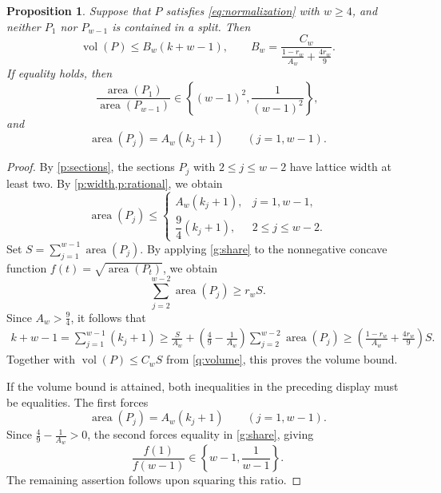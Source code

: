 \documentclass[reqno, 11pt]{article}
\numberwithin{equation}{section}
\newtheorem{proposition}[proposition]{Proposition}
\theoremstyle{definition}
\numberwithin{equation}{section}
\begin{document}
\begin{proposition}\label{g:nonsplit}
Suppose that \(P\) satisfies \eqref{eq:normalization} with \(w\ge4\), and neither \(P_1\) nor \(P_{w-1}\) is contained in a split. Then
\[
\operatorname{vol}(P)\le B_w(k+w-1),
\qquad
B_w=\frac{C_w}{\frac{1-r_w}{A_w}+\frac{4r_w}{9}}.
\]
If equality holds, then
\[
\frac{\operatorname{area}(P_1)}{\operatorname{area}(P_{w-1})}\in\left\{(w-1)^2,\frac{1}{(w-1)^2}\right\},
\]
and
\[
\operatorname{area}(P_j)=A_w(k_j+1)
\qquad(j=1,w-1).
\]
\end{proposition}
\begin{proof}
By \cref{p:sections}, the sections \(P_j\) with \(2\le j\le w-2\) have lattice width at least two. 
By \cref{p:width,p:rational}, we obtain
\[
\operatorname{area}(P_j)\le
\begin{cases}
A_w(k_j+1),&j=1,w-1,\\[2pt]
\dfrac94(k_j+1),&2\le j\le w-2.
\end{cases}
\]
Set $S=\sum_{j=1}^{w-1}\operatorname{area}(P_j)$. By applying \cref{g:share} to the nonnegative concave function
\(f(t)=\sqrt{\operatorname{area}(P_t)}\), we obtain
\[
\sum_{j=2}^{w-2}\operatorname{area}(P_j)\ge r_wS.
\]
Since \(A_w>\frac{9}{4}\), it follows that
\begin{align*}
k+w-1=\sum_{j=1}^{w-1}(k_j+1)\ge\frac{S}{A_w}+\left(\frac49-\frac1{A_w}\right)
 \sum_{j=2}^{w-2}\operatorname{area}(P_j)\ge\left(\frac{1-r_w}{A_w}+\frac{4r_w}{9}\right)S.
\end{align*}
Together with \(\operatorname{vol}(P)\le C_wS\) from \cref{q:volume}, this proves the volume bound.

If the volume bound is attained, both inequalities in the preceding display must be equalities. The first forces
\[
\operatorname{area}(P_j)=A_w(k_j+1)
\qquad(j=1,w-1).
\]
Since \(\frac{4}{9}-\frac{1}{A_w}>0\), the second forces equality in \cref{g:share}, giving
\[
\frac{f(1)}{f(w-1)}\in\left\{w-1,\frac1{w-1}\right\}.
\]
The remaining assertion follows upon squaring this ratio.
\end{proof}
\end{document}
